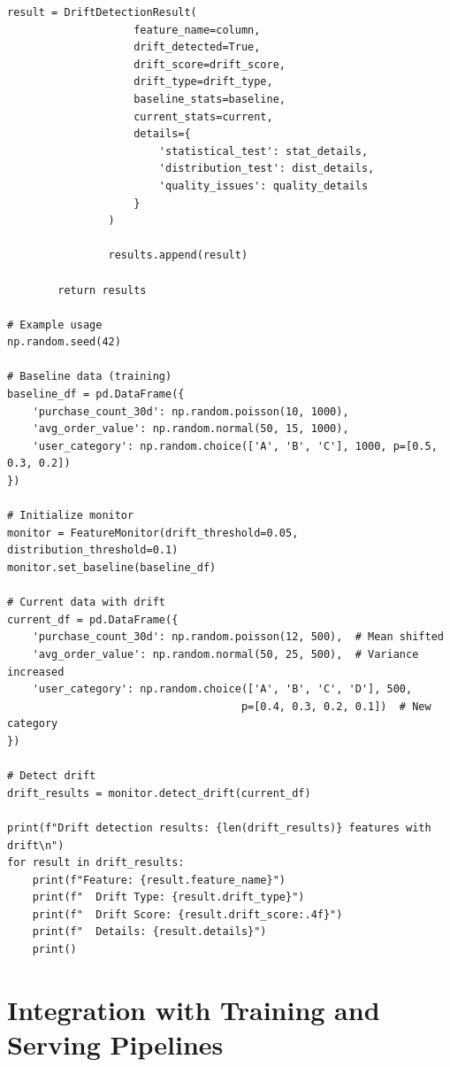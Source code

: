 \begin{lstlisting}[style=python, caption=Comprehensive feature monitoring and drift detection]
                result = DriftDetectionResult(
                    feature_name=column,
                    drift_detected=True,
                    drift_score=drift_score,
                    drift_type=drift_type,
                    baseline_stats=baseline,
                    current_stats=current,
                    details={
                        'statistical_test': stat_details,
                        'distribution_test': dist_details,
                        'quality_issues': quality_details
                    }
                )

                results.append(result)

        return results

# Example usage
np.random.seed(42)

# Baseline data (training)
baseline_df = pd.DataFrame({
    'purchase_count_30d': np.random.poisson(10, 1000),
    'avg_order_value': np.random.normal(50, 15, 1000),
    'user_category': np.random.choice(['A', 'B', 'C'], 1000, p=[0.5, 0.3, 0.2])
})

# Initialize monitor
monitor = FeatureMonitor(drift_threshold=0.05, distribution_threshold=0.1)
monitor.set_baseline(baseline_df)

# Current data with drift
current_df = pd.DataFrame({
    'purchase_count_30d': np.random.poisson(12, 500),  # Mean shifted
    'avg_order_value': np.random.normal(50, 25, 500),  # Variance increased
    'user_category': np.random.choice(['A', 'B', 'C', 'D'], 500,
                                     p=[0.4, 0.3, 0.2, 0.1])  # New category
})

# Detect drift
drift_results = monitor.detect_drift(current_df)

print(f"Drift detection results: {len(drift_results)} features with drift\n")
for result in drift_results:
    print(f"Feature: {result.feature_name}")
    print(f"  Drift Type: {result.drift_type}")
    print(f"  Drift Score: {result.drift_score:.4f}")
    print(f"  Details: {result.details}")
    print()
\end{lstlisting}

\section{Integration with Training and Serving Pipelines}

